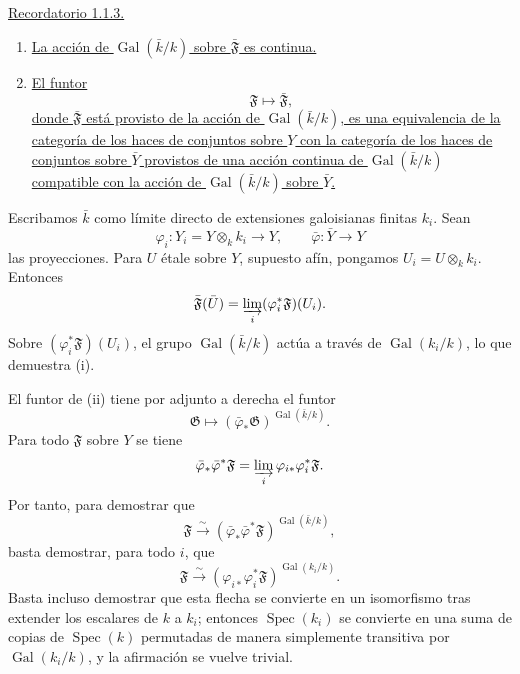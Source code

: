 \medskip
\noindent\underline{Recordatorio 1.1.3.}
\begin{enumerate}[label=(\roman*),leftmargin=2.7em]
\item \underline{La acción de $\operatorname{Gal}(\bar k/k)$ sobre
$\bar{\mathfrak F}$ es continua.}

\pageoriginale

\item \underline{El funtor}
\begin{equation*}
\mathfrak F\longmapsto\bar{\mathfrak F},
\end{equation*}
\underline{donde $\bar{\mathfrak F}$ está provisto de la acción de
$\operatorname{Gal}(\bar k/k)$, es una equivalencia de la categoría de los
haces de conjuntos sobre $Y$ con la categoría de los haces de conjuntos sobre
$\bar Y$ provistos de una acción continua de $\operatorname{Gal}(\bar k/k)$
compatible con la acción de $\operatorname{Gal}(\bar k/k)$ sobre $\bar Y$.}
\end{enumerate}

Escribamos $\bar k$ como límite directo de extensiones galoisianas finitas
$k_i$. Sean
\begin{equation*}
\varphi_i:Y_i=Y\otimes_k k_i\longrightarrow Y,
\qquad
\bar\varphi:\bar Y\longrightarrow Y
\end{equation*}
las proyecciones. Para $U$ étale sobre $Y$, supuesto afín, pongamos
$U_i=U\otimes_k k_i$. Entonces
\begin{equation*}
\bar{\mathfrak F}(\bar U)
=\varinjlim_i(\varphi_i^*\mathfrak F)(U_i).
\end{equation*}
Sobre $(\varphi_i^*\mathfrak F)(U_i)$, el grupo
$\operatorname{Gal}(\bar k/k)$ actúa a través de
$\operatorname{Gal}(k_i/k)$, lo que demuestra (i).

El funtor de (ii) tiene por adjunto a derecha el funtor
\begin{equation*}
\mathfrak G\longmapsto
(\bar\varphi_*\mathfrak G)^{\operatorname{Gal}(\bar k/k)}.
\end{equation*}
Para todo $\mathfrak F$ sobre $Y$ se tiene
\begin{equation*}
\bar\varphi_*\bar\varphi^*\mathfrak F
=\varinjlim_i\varphi_{i*}\varphi_i^*\mathfrak F.
\end{equation*}
Por tanto, para demostrar que
\begin{equation*}
\mathfrak F\xrightarrow{\sim}
(\bar\varphi_*\bar\varphi^*\mathfrak F)^{
  \operatorname{Gal}(\bar k/k)},
\end{equation*}
basta demostrar, para todo $i$, que
\begin{equation*}
\mathfrak F\xrightarrow{\sim}
(\varphi_{i*}\varphi_i^*\mathfrak F)^{
  \operatorname{Gal}(k_i/k)}.
\end{equation*}
Basta incluso demostrar que esta flecha se convierte en un isomorfismo tras
extender los escalares de $k$ a $k_i$; entonces
$\operatorname{Spec}(k_i)$ se convierte en una suma de copias de
$\operatorname{Spec}(k)$ permutadas de manera simplemente transitiva por
$\operatorname{Gal}(k_i/k)$, y la afirmación se vuelve trivial.

